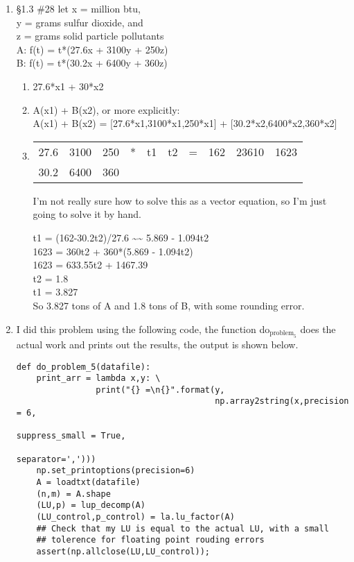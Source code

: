 \documentclass[11pt]{article}
\begin{document}
\begin{enumerate}
\item §1.3 \#28
let x = million btu,\\
    y = grams sulfur dioxide, and\\
    z = grams solid particle pollutants\\
A: f(t) = t*(27.6x + 3100y + 250z)\\
B: f(t) = t*(30.2x + 6400y + 360z)\\
\begin{enumerate}
\item 27.6*x1 + 30*x2
\item A(x1) + B(x2), or more explicitly:\\
A(x1) + B(x2) = [27.6*x1,3100*x1,250*x1] + [30.2*x2,6400*x2,360*x2]
\item \begin{center}
\begin{tabular}{rrrllllrrr}
27.6 & 3100 & 250 & * & t1 & t2 & = & 162 & 23610 & 1623\\
30.2 & 6400 & 360\\
\end{tabular}
\end{center}
I'm not really sure how to solve this as a vector equation,
so I'm just going to solve it by hand.

t1 = (162-30.2t2)/27.6 \textasciitilde{}\textasciitilde{} 5.869 - 1.094t2\\
1623 = 360t2 + 360*(5.869 - 1.094t2)\\
1623 = 633.55t2 + 1467.39\\
t2 = 1.8\\
t1 = 3.827\\
So 3.827 tons of A and 1.8 tons of B, with some rounding error.
\end{enumerate}
\item I did this problem using the following code, the function do\(_{\text{problem}}_{\text{5}}\) does
the actual work and prints out the results, the output is shown below.
\begin{verbatim}
def do_problem_5(datafile):
    print_arr = lambda x,y: \
                print("{} =\n{}".format(y,
                                        np.array2string(x,precision = 6,
                                                        suppress_small = True,
                                                        separator=',')))
    np.set_printoptions(precision=6)
    A = loadtxt(datafile)
    (n,m) = A.shape
    (LU,p) = lup_decomp(A)
    (LU_control,p_control) = la.lu_factor(A)
    ## Check that my LU is equal to the actual LU, with a small
    ## tolerence for floating point rouding errors
    assert(np.allclose(LU,LU_control));


\end{verbatim}
\end{enumerate}
\end{document}
